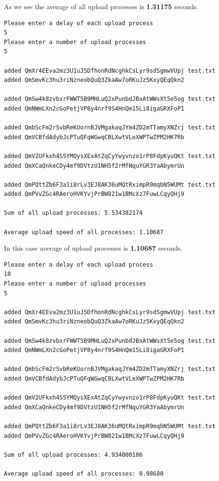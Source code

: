 \documentclass[a4paper,12pt,fleqn]{article}
\begin{document}
As we see the average of all upload processes is \textbf{1.31175} seconds.

\newpage
\begin{lstlisting}[caption={Upload test with delay which is equal to 5 seconds.},label={abc}]
Please enter a delay of each upload process
5
Please enter a number of upload processes
5

added QmXr4EEva2mz3U1uJ5DfhonRdNcghkCsLyr9sdSgmwVUpj test.txt
added QmSmvKc3hu3riNzneobQuQ3ZkaAw7oRKuJz5KxyQEqQkn2 

added QmSw4k8zvbxrFWWT5B9MHLuQ2xPunbdJBxAtWWsXt5e5og test.txt
added QmNWmLXn2cGoPetjVP8y4nrf9S4HnQm15Li8igaGRXFoP1 

added QmbScFm2rSvbReKUornBJVMgakaqJYm4ZD2mTTamyXNZrj test.txt
added QmVCBfdAdybJcPTuQFqWGwqCBLXwtVLeXWPTwZPM2HK7Rb 

added QmV2UFkxh4S5YMQysXExAtZqCyYwyvnzo1rP8FdpKyuQKt test.txt
added QmXCaQnkeCDy4mf9DVtzU1NH5f2rMfNquYGR3YaAbymrUn 

added QmPQttZb6F3a1i8rLv3EJ8AK36uMQtRximpR9mqbN5WUMt test.txt
added QmPVvZGc4RAeroHVKYvjPrBW821w1BMcXz7FuwLCqyQHj9 

Sum of all upload processes: 5.534382174

Average upload speed of all processes: 1.10687
\end{lstlisting}    

In this case average of upload processes is \textbf{1.10687} seconds.

\begin{lstlisting}[caption={Upload test with delay which is equal to 10 seconds.},label={abc}]
Please enter a delay of each upload process
10
Please enter a number of upload processes
5

added QmXr4EEva2mz3U1uJ5DfhonRdNcghkCsLyr9sdSgmwVUpj test.txt
added QmSmvKc3hu3riNzneobQuQ3ZkaAw7oRKuJz5KxyQEqQkn2 

added QmSw4k8zvbxrFWWT5B9MHLuQ2xPunbdJBxAtWWsXt5e5og test.txt
added QmNWmLXn2cGoPetjVP8y4nrf9S4HnQm15Li8igaGRXFoP1 

added QmbScFm2rSvbReKUornBJVMgakaqJYm4ZD2mTTamyXNZrj test.txt
added QmVCBfdAdybJcPTuQFqWGwqCBLXwtVLeXWPTwZPM2HK7Rb 

added QmV2UFkxh4S5YMQysXExAtZqCyYwyvnzo1rP8FdpKyuQKt test.txt
added QmXCaQnkeCDy4mf9DVtzU1NH5f2rMfNquYGR3YaAbymrUn 

added QmPQttZb6F3a1i8rLv3EJ8AK36uMQtRximpR9mqbN5WUMt test.txt
added QmPVvZGc4RAeroHVKYvjPrBW821w1BMcXz7FuwLCqyQHj9 

Sum of all upload processes: 4.934000186

Average upload speed of all processes: 0.98680
\end{lstlisting}    
\end{document}

